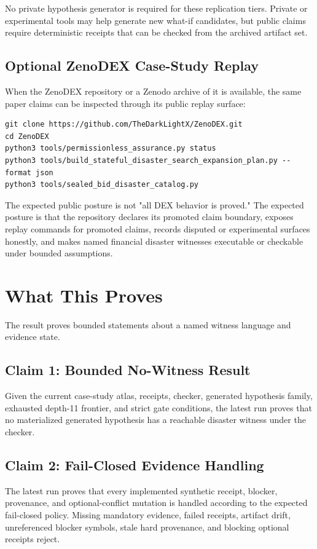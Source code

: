 \documentclass[11pt]{article}
\begin{document}
No private hypothesis generator is required for these replication tiers. Private or experimental tools may help generate new what-if candidates, but public claims require deterministic receipts that can be checked from the archived artifact set.

\subsection{Optional ZenoDEX Case-Study Replay}
When the ZenoDEX repository or a Zenodo archive of it is available, the same paper claims can be inspected through its public replay surface:

\begin{verbatim}
git clone https://github.com/TheDarkLightX/ZenoDEX.git
cd ZenoDEX
python3 tools/permissionless_assurance.py status
python3 tools/build_stateful_disaster_search_expansion_plan.py --format json
python3 tools/sealed_bid_disaster_catalog.py
\end{verbatim}
The expected public posture is not "all DEX behavior is proved." The expected posture is that the repository declares its promoted claim boundary, exposes replay commands for promoted claims, records disputed or experimental surfaces honestly, and makes named financial disaster witnesses executable or checkable under bounded assumptions.

\section{What This Proves}
The result proves bounded statements about a named witness language and evidence state.

\subsection{Claim 1: Bounded No-Witness Result}
Given the current case-study atlas, receipts, checker, generated hypothesis family, exhausted depth-11 frontier, and strict gate conditions, the latest run proves that no materialized generated hypothesis has a reachable disaster witness under the checker.

\subsection{Claim 2: Fail-Closed Evidence Handling}
The latest run proves that every implemented synthetic receipt, blocker, provenance, and optional-conflict mutation is handled according to the expected fail-closed policy. Missing mandatory evidence, failed receipts, artifact drift, unreferenced blocker symbols, stale hard provenance, and blocking optional receipts reject.
\end{document}
